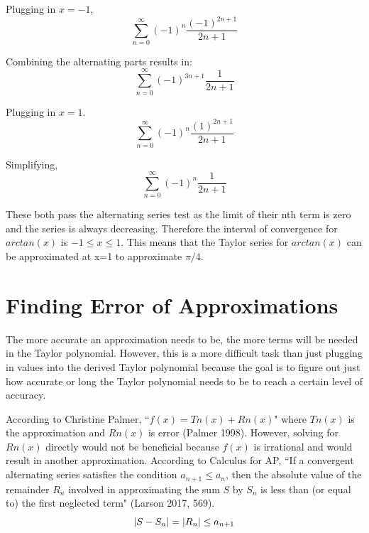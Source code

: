 \documentclass[12pt, titlepage]{article}
\begin{document}
Plugging in \(x = -1\),
\begin{equation*}
    \sum_{n=0}^{\infty} (-1)^{n} \frac{(-1)^{2n+1}}{2n+1}
\end{equation*}

Combining the alternating parts results in:
\begin{equation*}
    \sum_{n=0}^{\infty} (-1)^{3n+1} \frac{1}{2n+1}
\end{equation*}

Plugging in \(x = 1\).
\begin{equation*}
    \sum_{n=0}^{\infty} (-1)^{n} \frac{(1)^{2n+1}}{2n+1}
\end{equation*}

Simplifying,
\begin{equation*}
    \sum_{n=0}^{\infty} (-1)^{n} \frac{1}{2n+1}
\end{equation*}

These both pass the alternating series test as the limit of their nth term is zero and the series is always decreasing. Therefore the interval of convergence for \(arctan(x)\) is \( -1 \leq x \leq 1 \). This means that the Taylor series for \(arctan(x)\) can be approximated at x=1 to approximate \(\pi/4\).

\section{Finding Error of Approximations}
The more accurate an approximation needs to be, the more terms will be needed in the Taylor polynomial. However, this is a more difficult task than just plugging in values into the derived Taylor polynomial because the goal is to figure out just how accurate or long the Taylor polynomial needs to be to reach a certain level of accuracy.

According to Christine Palmer, ``\(f(x) = Tn(x) + Rn(x)\)" where \(Tn(x)\) is the approximation and \(Rn(x)\) is error (Palmer 1998). However, solving for \(Rn(x)\) directly would not be beneficial because \(f(x)\) is irrational and would result in another approximation.
According to Calculus for AP, ``If a convergent alternating series satisfies the condition \(a_{n+1} \leq a_{n} \), then the absolute value of the remainder \(R_{n}\) involved in approximating the sum \(S\) by \(S_{n}\) is less than (or equal to) the first neglected term" (Larson 2017, 569).
\begin{equation*}
  \abs{S - S_{n}} = \abs{R_{n}} \leq a_{n + 1}
\end{equation*}
\end{document}
